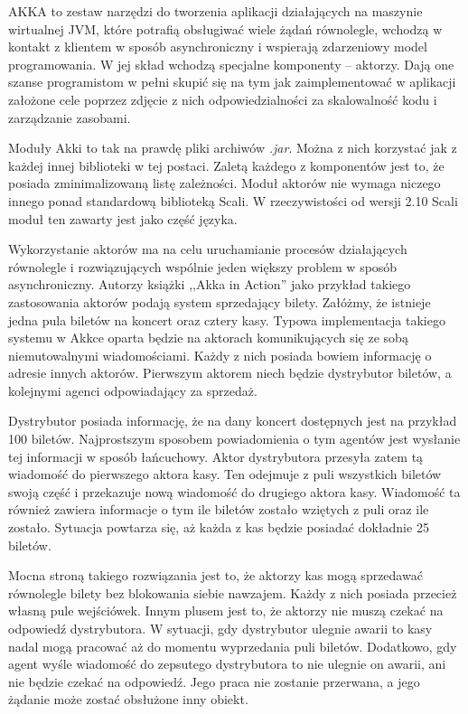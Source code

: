 \documentclass[brudnopis]{xmgr}
\begin{document}
AKKA to zestaw narzędzi do tworzenia aplikacji działających na maszynie wirtualnej JVM, które potrafią obsługiwać wiele żądań równolegle, wchodzą w kontakt z klientem w sposób asynchroniczny i wspierają zdarzeniowy model programowania. W jej skład wchodzą specjalne komponenty -- aktorzy. Dają one szanse programistom w pełni skupić się na tym jak zaimplementować w aplikacji założone cele poprzez zdjęcie z nich odpowiedzialności za skalowalność kodu i zarządzanie zasobami.   

Moduły Akki to tak na prawdę pliki archiwów \emph{.jar}. Można z nich korzystać jak z każdej innej biblioteki w tej postaci. Zaletą każdego z komponentów jest to, że posiada zminimalizowaną listę zależności. Moduł aktorów nie wymaga niczego innego ponad standardową biblioteką Scali. W rzeczywistości od wersji 2.10 Scali moduł ten zawarty jest jako część języka. 

Wykorzystanie aktorów ma na celu uruchamianie procesów działających równolegle i rozwiązujących wspólnie jeden większy problem w sposób asynchroniczny. Autorzy książki ,,Akka in Action'' \cite[s. 9]{Roestenburg:2012:AIA} jako przykład takiego zastosowania aktorów podają system sprzedający bilety. Załóżmy, że istnieje jedna pula biletów na koncert oraz cztery kasy. Typowa implementacja takiego systemu w Akkce oparta będzie na aktorach komunikujących się ze sobą niemutowalnymi wiadomościami. Każdy z nich posiada bowiem informację o adresie innych aktorów. Pierwszym aktorem niech będzie dystrybutor biletów, a kolejnymi agenci odpowiadający za sprzedaż.

Dystrybutor posiada informację, że na dany koncert dostępnych jest na przykład 100 biletów. Najprostszym sposobem powiadomienia o tym agentów jest wysłanie tej informacji w sposób łańcuchowy. Aktor dystrybutora przesyła zatem tą wiadomość do pierwszego aktora kasy. Ten odejmuje z puli wszystkich biletów swoją część i przekazuje nową wiadomość do drugiego aktora kasy. Wiadomość ta również zawiera informacje o tym ile biletów zostało wziętych z puli oraz ile zostało. Sytuacja powtarza się, aż każda z kas będzie posiadać dokładnie 25 biletów.

Mocna stroną takiego rozwiązania jest to, że aktorzy kas mogą sprzedawać równolegle bilety bez blokowania siebie nawzajem. Każdy z nich posiada przecież własną pule wejściówek. Innym plusem jest to, że aktorzy nie muszą czekać na odpowiedź dystrybutora. W sytuacji, gdy dystrybutor ulegnie awarii to kasy nadal mogą pracować aż do momentu wyprzedania puli biletów. Dodatkowo, gdy agent wyśle wiadomość do zepsutego dystrybutora to nie ulegnie on awarii, ani nie będzie czekać na odpowiedź. Jego praca nie zostanie przerwana, a jego żądanie może zostać obsłużone inny obiekt.
\end{document}
